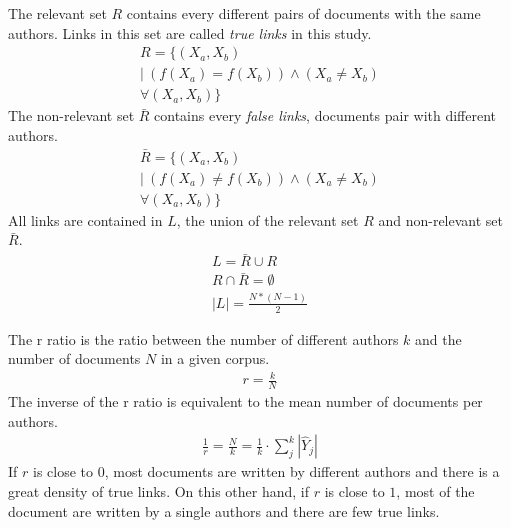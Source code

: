 \begin{definition}
  The relevant set $R$ contains every different pairs of documents with the same authors.
  Links in this set are called \textit{true links} in this study.
  \begin{gather*}
    R = \{(X_a, X_b)\ \\
    |\ \left( f(X_a) = f(X_b) \right) \land \left(X_a \neq X_b \right) \\
    \forall (X_a, X_b) \}
  \end{gather*}
  The non-relevant set $\bar{R}$ contains every \textit{false links}, documents pair with different authors.
  \begin{gather*}
    \bar{R} = \{(X_a, X_b)\ \\
    |\ \left( f(X_a) \neq f(X_b) \right) \land \left(X_a \neq X_b \right) \\
    \forall (X_a, X_b)\}
  \end{gather*}
  All links are contained in $L$, the union of the relevant set $R$ and non-relevant set $\bar{R}$.
  \begin{gather*}
    L = \bar{R} \cup R \\
    R \cap \bar{R} = \emptyset \\
    |L| = \frac{N * (N-1)}{2}
  \end{gather*}
\end{definition}

\begin{definition}
  The r ratio is the ratio between the number of different authors $k$ and the number of documents $N$ in a given corpus.
  \begin{gather*}
    r = \frac{k}{N}
  \end{gather*}
  The inverse of the r ratio is equivalent to the mean number of documents per authors.
  \begin{gather*}
    \frac{1}{r} = \frac{N}{k} = \frac{1}{k} \cdot \sum_{j}^{k} |\hat{Y}_j|
  \end{gather*}
  If $r$ is close to $0$, most documents are written by different authors and there is a great density of true links.
  On this other hand, if $r$ is close to $1$, most of the document are written by a single authors and there are few true links.
\end{definition}


